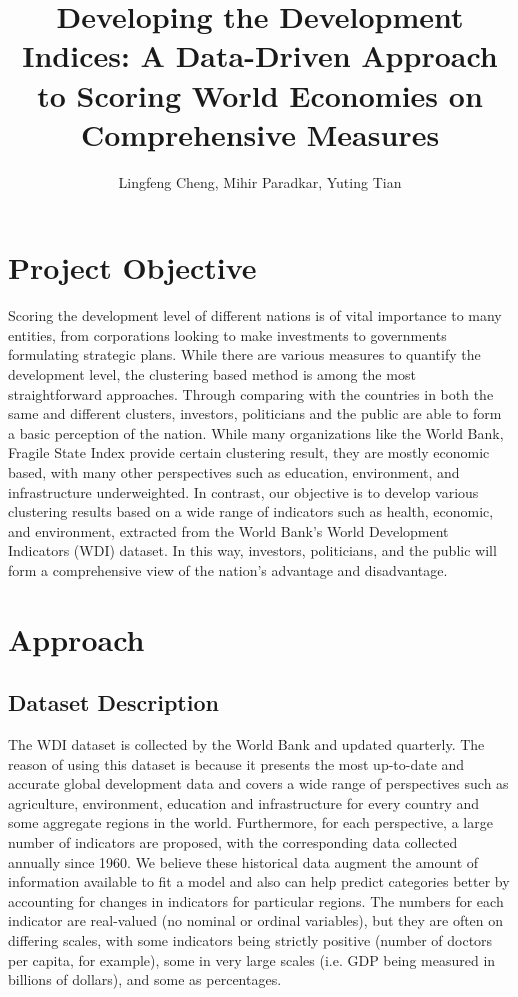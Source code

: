\documentclass[a4paper]{article}
\title{Developing the Development Indices: A Data-Driven Approach to Scoring World Economies on Comprehensive Measures}
\author{Lingfeng Cheng, Mihir Paradkar, Yuting Tian}
\begin{document}
\maketitle



\section{Project Objective}
Scoring the development level of different nations is of vital importance to many entities, from corporations looking to make investments to governments formulating strategic plans. While there are various measures to quantify the development level, the clustering based method is among the most straightforward approaches. Through comparing with the countries in both the same and different clusters, investors, politicians and the public are able to form a basic perception of the nation. While many organizations like the World Bank, Fragile State Index provide certain clustering result, they are mostly economic based, with many other perspectives such as education, environment, and infrastructure underweighted. In contrast, our objective is to develop various clustering results based on a wide range of indicators such as health, economic, and environment, extracted from the World Bank's World Development Indicators (WDI) dataset. In this way, investors, politicians, and the public will form a comprehensive view of the nation's advantage and disadvantage. 
\section{Approach}
\subsection{Dataset Description}
The WDI dataset is collected by the World Bank and updated quarterly. The reason of using this dataset is because it presents the most up-to-date and accurate global development data and covers a wide range of perspectives such as agriculture, environment, education and infrastructure for every country and some aggregate regions in the world. Furthermore, for each perspective, a large number of indicators are proposed, with the corresponding data collected annually since 1960. We believe these historical data augment the amount of information available to fit a model and also can help predict categories better by accounting for changes in indicators for particular regions. The numbers for each indicator are real-valued (no nominal or ordinal variables), but they are often on differing scales, with some indicators being strictly positive (number of doctors per capita, for example), some in very large scales (i.e. GDP being measured in billions of dollars), and some as percentages.
\end{document}
